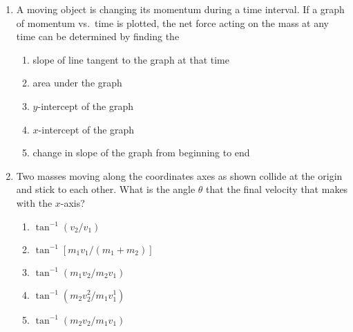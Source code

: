 \documentclass{../../../oss-apphys}
\begin{document}
\begin{multicols}{2}
\begin{enumerate}[resume,leftmargin=18pt]
  \item A moving object is changing its momentum during a time interval. If a
    graph of momentum vs.\ time is plotted, the net force acting on the mass
    at any time can be determined by finding the
    \begin{enumerate}[nosep,leftmargin=18pt,label=(\Alph*)]
    \item slope of line tangent to the graph at that time
    \item area under the graph
    \item $y$-intercept of the graph
    \item $x$-intercept of the graph
    \item change in slope of the graph from beginning to end
    \end{enumerate}
    \columnbreak
    
  \item Two masses moving along the coordinates axes as shown collide at the
    origin and stick to each other. What is the angle $\theta$ that the final
    velocity that makes with the $x$-axis?
    \begin{center}
    \end{center}
    \begin{enumerate}[nosep,leftmargin=18pt,label=(\Alph*)]
    \item $\tan^{-1}(v_2/v_1)$
    \item $\tan^{-1}[m_1v_1/(m_1+m_2)]$
    \item $\tan^{-1}(m_1v_2/m_2v_1)$
    \item $\tan^{-1}(m_2v_2^2/m_1v_1^1)$
    \item $\tan^{-1}(m_2v_2/m_1v_1)$
    \end{enumerate}
    

\end{enumerate}
\end{multicols}
\end{document}
